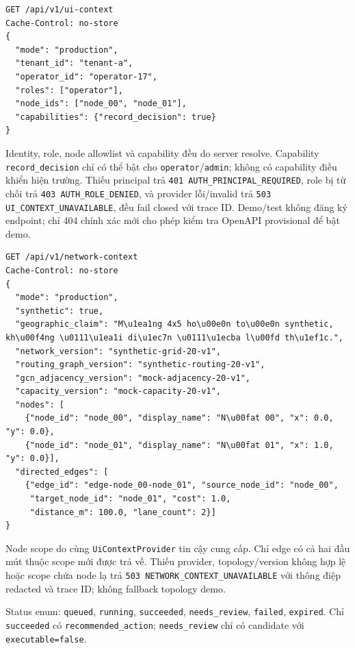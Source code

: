 \begin{lstlisting}[caption={Trusted production UI context},label={lst:api_ui_context}]
GET /api/v1/ui-context
Cache-Control: no-store
{
  "mode": "production",
  "tenant_id": "tenant-a",
  "operator_id": "operator-17",
  "roles": ["operator"],
  "node_ids": ["node_00", "node_01"],
  "capabilities": {"record_decision": true}
}
\end{lstlisting}

Identity, role, node allowlist và capability đều do server resolve. Capability
\texttt{record\_decision} chỉ có thể bật cho \texttt{operator}/\texttt{admin};
không có capability điều khiển hiện trường. Thiếu principal trả
\texttt{401 AUTH\_PRINCIPAL\_REQUIRED}, role bị từ chối trả
\texttt{403 AUTH\_ROLE\_DENIED}, và provider lỗi/invalid trả
\texttt{503 UI\_CONTEXT\_UNAVAILABLE}, đều fail closed với trace ID. Demo/test
không đăng ký endpoint; chỉ 404 chính xác mới cho phép kiểm tra OpenAPI
provisional để bật demo.

\begin{lstlisting}[caption={Authorized synthetic network context},label={lst:api_network_context}]
GET /api/v1/network-context
Cache-Control: no-store
{
  "mode": "production",
  "synthetic": true,
  "geographic_claim": "M\u1ea1ng 4x5 ho\u00e0n to\u00e0n synthetic, kh\u00f4ng \u0111\u1ea1i di\u1ec7n \u0111\u1ecba l\u00fd th\u1ef1c.",
  "network_version": "synthetic-grid-20-v1",
  "routing_graph_version": "synthetic-routing-20-v1",
  "gcn_adjacency_version": "mock-adjacency-20-v1",
  "capacity_version": "mock-capacity-20-v1",
  "nodes": [
    {"node_id": "node_00", "display_name": "N\u00fat 00", "x": 0.0, "y": 0.0},
    {"node_id": "node_01", "display_name": "N\u00fat 01", "x": 1.0, "y": 0.0}],
  "directed_edges": [
    {"edge_id": "edge-node_00-node_01", "source_node_id": "node_00",
     "target_node_id": "node_01", "cost": 1.0,
     "distance_m": 100.0, "lane_count": 2}]
}
\end{lstlisting}

Node scope do cùng \texttt{UiContextProvider} tin cậy cung cấp. Chỉ edge có cả
hai đầu mút thuộc scope mới được trả về. Thiếu provider, topology/version không
hợp lệ hoặc scope chứa node lạ trả \texttt{503 NETWORK\_CONTEXT\_UNAVAILABLE}
với thông điệp redacted và trace ID; không fallback topology demo.

Status enum: \texttt{queued}, \texttt{running}, \texttt{succeeded}, \texttt{needs\_review}, \texttt{failed}, \texttt{expired}. Chỉ \texttt{succeeded} có \texttt{recommended\_action}; \texttt{needs\_review} chỉ có candidate với \texttt{executable=false}.

